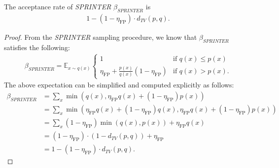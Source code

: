 \documentclass[10pt,a4paper]{amsart}
\begin{document}
\begin{theorem}\label{the: acceptance_rate}
    The acceptance rate of \textit{SPRINTER} $\beta_{\textit{SPRINTER}}$ is 
    \begin{align}
        1-(1-\eta_\text{FP})\cdot d_{TV}(p,q).
    \end{align}
\end{theorem}

\begin{proof}
From the \textit{SPRINTER} sampling procedure, we know that $\beta_{\textit{SPRINTER}}$ satisfies the following:
\begin{align}
    \beta_{\textit{SPRINTER}} = \mathbb{E}_{x\sim q(x)}
    \begin{cases} 
1 & \text{if } q(x) \leq p(x) \\
\eta_\text{FP}+\frac{p(x)}{q(x)} (1-\eta_\text{FP})& \text{if } q(x) > p(x).
\end{cases} 
\end{align}
The above expectation can be simplified and computed explicitly as follows:
\begin{align}
   \beta_{\textit{SPRINTER}} & = \sum_{x} \min(q(x), \eta_\text{FP} q(x) + (1-\eta_\text{FP})p(x))\nonumber\\
    &=\sum_{x} \min(\eta_\text{FP} q(x)+(1-\eta_\text{FP})q(x), \eta_\text{FP} q(x) + (1-\eta_\text{FP})p(x))\nonumber\\
    &=\sum_{x} (1-\eta_\text{FP})\min(q(x), p(x))+ \eta_\text{FP} q(x)\nonumber\\
    & = (1-\eta_\text{FP}) \cdot(1-d_{TV}(p,q)) + \eta_\text{FP}\nonumber\\
    &= 1-(1-\eta_\text{FP})\cdot d_{TV}(p,q).
\end{align}
\end{proof}
\end{document}
